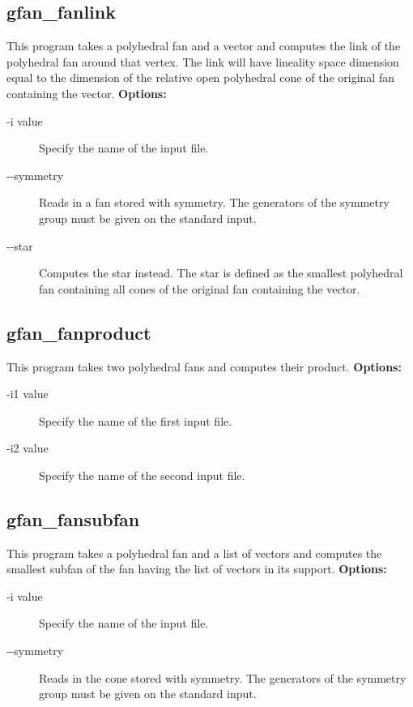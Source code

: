 {{{{{{{\subsection{gfan\_fanlink}\label{applist:_fanlink}
This program takes a polyhedral fan and a vector and computes the link of the polyhedral fan around that vertex. The link will have lineality space dimension equal to the dimension of the relative open polyhedral cone of the original fan containing the vector.
\newline
{\bf Options:}
\begin{description}
\item[-i value]Specify the name of the input file.\item[-\hspace{0.013cm}-symmetry]Reads in a fan stored with symmetry. The generators of the symmetry group must be given on the standard input.
\item[-\hspace{0.013cm}-star]Computes the star instead. The star is defined as the smallest polyhedral fan containing all cones of the original fan containing the vector.\end{description}


{\subsection{gfan\_fanproduct}\label{applist:_fanproduct}
This program takes two polyhedral fans and computes their product.
\newline
{\bf Options:}
\begin{description}
\item[-i1 value]Specify the name of the first input file.\item[-i2 value]Specify the name of the second input file.\end{description}


{\subsection{gfan\_fansubfan}\label{applist:_fansubfan}
This program takes a polyhedral fan and a list of vectors and computes the smallest subfan of the fan having the list of vectors in its support.
\newline
{\bf Options:}
\begin{description}
\item[-i value]Specify the name of the input file.\item[-\hspace{0.013cm}-symmetry]Reads in the cone stored with symmetry. The generators of the symmetry group must be given on the standard input.
\end{description}


}}}}}}}}}
